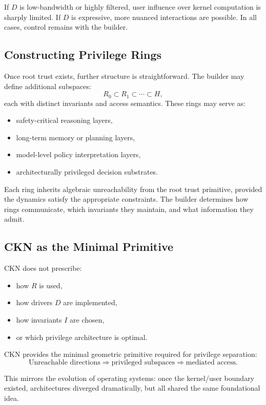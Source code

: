 \documentclass[11pt,a4paper]{article}
\begin{document}
If $D$ is low-bandwidth or highly filtered, user influence over kernel computation is sharply limited. If $D$ is expressive, more nuanced interactions are possible. In all cases, control remains with the builder.

\subsection{Constructing Privilege Rings}

Once root trust exists, further structure is straightforward. The builder may define additional subspaces:
\[
R_0 \subset R_1 \subset \cdots \subset H,
\]
each with distinct invariants and access semantics. These rings may serve as:
\begin{itemize}
    \item safety-critical reasoning layers,
    \item long-term memory or planning layers,
    \item model-level policy interpretation layers,
    \item architecturally privileged decision substrates.
\end{itemize}

Each ring inherits algebraic unreachability from the root trust primitive, provided the dynamics satisfy the appropriate constraints. The builder determines how rings communicate, which invariants they maintain, and what information they admit.

\subsection{CKN as the Minimal Primitive}

CKN does not prescribe:
\begin{itemize}
    \item how $R$ is used,
    \item how drivers $D$ are implemented,
    \item how invariants $I$ are chosen,
    \item or which privilege architecture is optimal.
\end{itemize}

CKN provides the minimal geometric primitive required for privilege separation:
\[
\text{Unreachable directions} \Rightarrow \text{privileged subspaces} \Rightarrow \text{mediated access}.
\]

This mirrors the evolution of operating systems: once the kernel/user boundary existed, architectures diverged dramatically, but all shared the same foundational idea.
\end{document}
